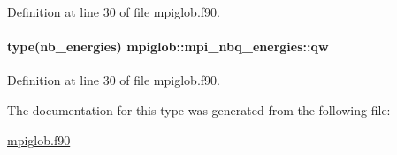 Definition at line 30 of file mpiglob.\-f90.

\hypertarget{structmpiglob_1_1mpi__nbq__energies_a3dc2c7eb0d0c9131d04c06c1861ef729}{
\paragraph[{qw}]{\setlength{\rightskip}{0pt plus 5cm}type(nb\-\_\-energies) mpiglob\-::mpi\-\_\-nbq\-\_\-energies\-::qw}}\label{structmpiglob_1_1mpi__nbq__energies_a3dc2c7eb0d0c9131d04c06c1861ef729}


Definition at line 30 of file mpiglob.\-f90.



The documentation for this type was generated from the following file\-:\begin{DoxyCompactItemize}
\item 
\hyperlink{mpiglob_8f90}{mpiglob.\-f90}\end{DoxyCompactItemize}
